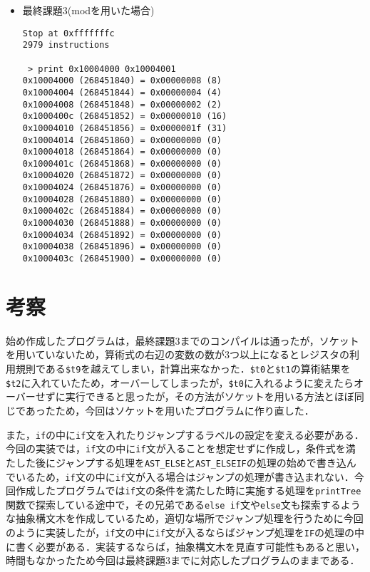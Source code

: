 \documentclass{jarticle}[11pt]
\begin{document}
\begin{itemize}
\item 最終課題$3$(modを用いた場合)
\begin{verbatim}
Stop at 0xfffffffc
2979 instructions

 > print 0x10004000 0x10004001
0x10004000 (268451840) = 0x00000008 (8)
0x10004004 (268451844) = 0x00000004 (4)
0x10004008 (268451848) = 0x00000002 (2)
0x1000400c (268451852) = 0x00000010 (16)
0x10004010 (268451856) = 0x0000001f (31)
0x10004014 (268451860) = 0x00000000 (0)
0x10004018 (268451864) = 0x00000000 (0)
0x1000401c (268451868) = 0x00000000 (0)
0x10004020 (268451872) = 0x00000000 (0)
0x10004024 (268451876) = 0x00000000 (0)
0x10004028 (268451880) = 0x00000000 (0)
0x1000402c (268451884) = 0x00000000 (0)
0x10004030 (268451888) = 0x00000000 (0)
0x10004034 (268451892) = 0x00000000 (0)
0x10004038 (268451896) = 0x00000000 (0)
0x1000403c (268451900) = 0x00000000 (0)
\end{verbatim}
\end{itemize}

\section{考察}
始め作成したプログラムは，最終課題3までのコンパイルは通ったが，ソケットを用いていないため，算術式の右辺の変数の数が$3$つ以上になるとレジスタの利用規則である\verb|$t9|を越えてしまい，計算出来なかった．\verb|$t0|と\verb|$t1|の算術結果を\verb|$t2|に入れていたため，オーバーしてしまったが，\verb|$t0|に入れるように変えたらオーバーせずに実行できると思ったが，その方法がソケットを用いる方法とほぼ同じであったため，今回はソケットを用いたプログラムに作り直した．

また，\verb|if|の中に\verb|if|文を入れたりジャンプするラベルの設定を変える必要がある．今回の実装では，\verb|if|文の中に\verb|if|文が入ることを想定せずに作成し，条件式を満たした後にジャンプする処理を\verb|AST_ELSE|と\verb|AST_ELSEIF|の処理の始めで書き込んでいるため，\verb|if|文の中に\verb|if|文が入る場合はジャンプの処理が書き込まれない．今回作成したプログラムでは\verb|if|文の条件を満たした時に実施する処理を\verb|printTree|関数で探索している途中で，その兄弟である\verb|else if|文や\verb|else|文も探索するような抽象構文木を作成しているため，適切な場所でジャンプ処理を行うために今回のように実装したが，\verb|if|文の中に\verb|if|文が入るならばジャンプ処理を\verb|IF|の処理の中に書く必要がある．実装するならば，抽象構文木を見直す可能性もあると思い，時間もなかったため今回は最終課題$3$までに対応したプログラムのままである．
\end{document}
